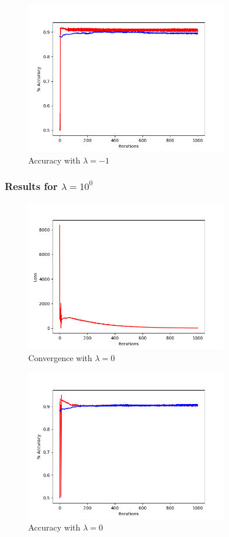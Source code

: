 \documentclass[letterpaper,10pt]{article}
\begin{document}
     \begin{figure}[ht]
    \centering
   \includegraphics[width=250pt]{L2-neg1-gradientLong.png}
     \caption{Accuracy with \(\lambda = -1\)}
    \label{fig:Plot of accuracy over iterations. Red is training data.}
    \end{figure}
\subsubsection{Results for \(\lambda = 10^{0}\)}
     \begin{figure}[ht]
    \centering
   \includegraphics[width=250pt]{L2-0-convergence.png}
    \caption{Convergence with \(\lambda = 0\)}
    \label{fig:Convergence of loss function over iterations}
    \end{figure}

     \begin{figure}[ht]
    \centering
   \includegraphics[width=250pt]{L2-0-gradientLong.png}
     \caption{Accuracy with \(\lambda = 0\)}
    \label{fig:Plot of accuracy over iterations. Red is training data.}
    \end{figure}
\end{document}
